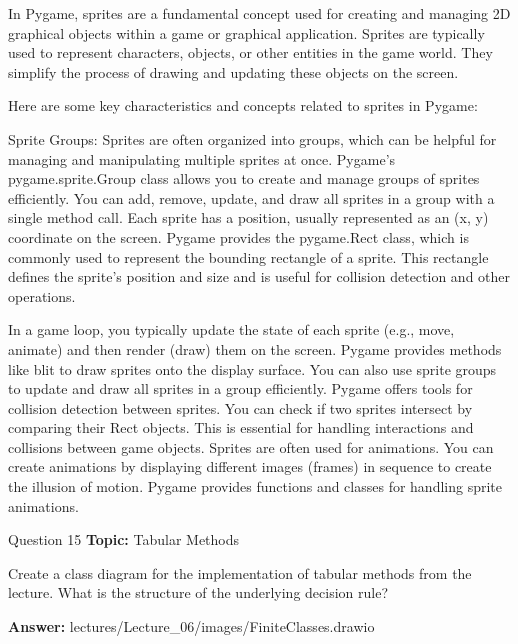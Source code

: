 \begin{frame}
    In Pygame, sprites are a fundamental concept used for creating and managing 2D graphical objects within a game or graphical application. Sprites are typically used to represent characters, objects, or other entities in the game world. They simplify the process of drawing and updating these objects on the screen.

Here are some key characteristics and concepts related to sprites in Pygame:

Sprite Groups: Sprites are often organized into groups, which can be helpful for managing and manipulating multiple sprites at once. Pygame's pygame.sprite.Group class allows you to create and manage groups of sprites efficiently. You can add, remove, update, and draw all sprites in a group with a single method call.
Each sprite has a position, usually represented as an (x, y) coordinate on the screen. Pygame provides the pygame.Rect class, which is commonly used to represent the bounding rectangle of a sprite. This rectangle defines the sprite's position and size and is useful for collision detection and other operations.
\end{frame}
\begin{frame}
    In a game loop, you typically update the state of each sprite (e.g., move, animate) and then render (draw) them on the screen. Pygame provides methods like blit to draw sprites onto the display surface. You can also use sprite groups to update and draw all sprites in a group efficiently.
    Pygame offers tools for collision detection between sprites. You can check if two sprites intersect by comparing their Rect objects. This is essential for handling interactions and collisions between game objects.
    Sprites are often used for animations. You can create animations by displaying different images (frames) in sequence to create the illusion of motion. Pygame provides functions and classes for handling sprite animations.
\end{frame}

\begin{frame}{Question 15}
    \textbf{Topic:} Tabular Methods
    \vspace{10pt}

    Create a class diagram for the implementation of tabular methods from the lecture. What is the structure of the underlying decision rule? 
    \vspace{20pt}

    \textbf{Answer:} lectures/Lecture\_06/images/FiniteClasses.drawio
\end{frame}


